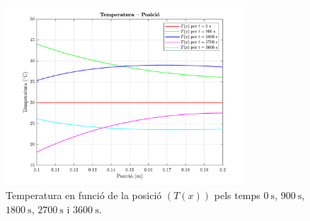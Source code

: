 \begin{figure}[ht]
	\centering
	\includegraphics[width=0.8\textwidth]{imagenes/03_resolucio/temperatura_posicio.pdf}
	\captionsetup{width=0.8\textwidth}
	\caption{Temperatura en funció de la posició $(T(x))$ pels temps $0 \ \si{\second}$, $900 \ \si{\second}$, $1800 \ \si{\second}$, $2700 \ \si{\second}$ i $3600 \ \si{\second}$.}
	\label{fig:temperatura_posicio}
\end{figure}

